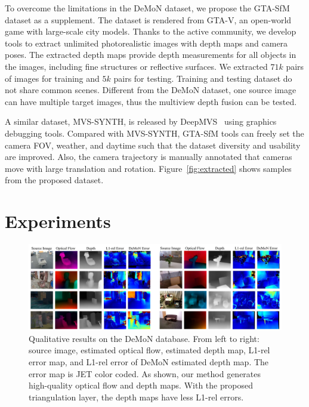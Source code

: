 \documentclass[letterpaper, 10 pt, conference]{ieeeconf}  %
\begin{document}
To overcome the limitations in the DeMoN dataset, we propose the GTA-SfM dataset as a supplement. The dataset is rendered from GTA-V, an open-world game with large-scale city models. Thanks to the active community, we develop tools to extract unlimited photorealistic images with depth maps and camera poses. The extracted depth maps provide depth measurements for all objects in the images, including fine structures or reflective surfaces. We extracted $71k$ pairs of images for training and $5k$ pairs for testing. Training and testing dataset do not share common scenes. Different from the DeMoN dataset, one source image can have multiple target images, thus the multiview depth fusion can be tested.
 
A similar dataset, MVS-SYNTH, is released by DeepMVS~\cite{DeepMVS} using graphics debugging tools. Compared with MVS-SYNTH, GTA-SfM tools can freely set the camera FOV, weather, and daytime such that the dataset diversity and usability are improved. Also, the camera trajectory is manually annotated that cameras move with large translation and rotation. Figure~\ref{fig:extracted} shows samples from the proposed dataset.
 
\section{Experiments}
 
\begin{figure}[t]
\begin{center}
\includegraphics[width=1.0\linewidth]{figs/quality_compare.pdf}
\end{center}
\vspace{-0.4cm}
\caption{Qualitative results on the DeMoN database. From left to right: source image, estimated optical flow, estimated depth map, L1-rel error map, and L1-rel error of DeMoN estimated depth map. The error map is JET color coded. As shown, our method generates high-quality optical flow and depth maps. With the proposed triangulation layer, the depth maps have less L1-rel errors.}
\label{fig:quality_compare}
\vspace{-0.4cm}
\end{figure}
 
\end{document}
